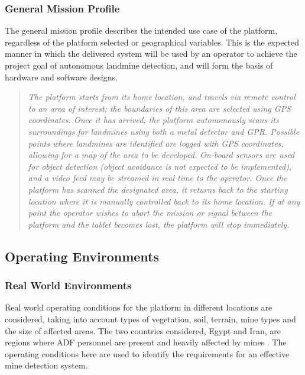 \documentclass[main.tex]{subfiles}
\begin{document}
\subsubsection{General Mission Profile}
The general mission profile describes the intended use case of the platform, regardless of the platform selected or geographical variables. This is the expected manner in which the delivered system will be used by an operator to achieve the project goal of autonomous landmine detection, and will form the basis of hardware and software designs.
\begin{quote}\textit{The platform starts from its home location, and travels via remote control to an area of interest; the boundaries of this area are selected using GPS coordinates. Once it has arrived, the platform autonomously scans its surroundings for landmines using both a metal detector and GPR. Possible points where landmines are identified are logged with GPS coordinates, allowing for a map of the area to be developed. On-board sensors are used for object detection (object avoidance is not expected to be implemented), and a video feed may be streamed in real time to the operator. Once the platform has scanned the designated area, it returns back to the starting location where it is manually controlled back to its home location. If at any point the operator wishes to abort the mission or signal between the platform and the tablet becomes lost, the platform will stop immediately.}
\end{quote}
\subsection{Operating Environments}
\subsubsection{Real World Environments}

Real world operating conditions for the platform in different locations are considered, taking into account types of vegetation, soil, terrain, mine types and the size of affected areas. The two countries considered, Egypt and Iran, are regions where ADF personnel are present and heavily affected by mines \parencite{AustralianGovernment2016}. The operating conditions here are used to identify the requirements for an effective mine detection system.

\end{document}
